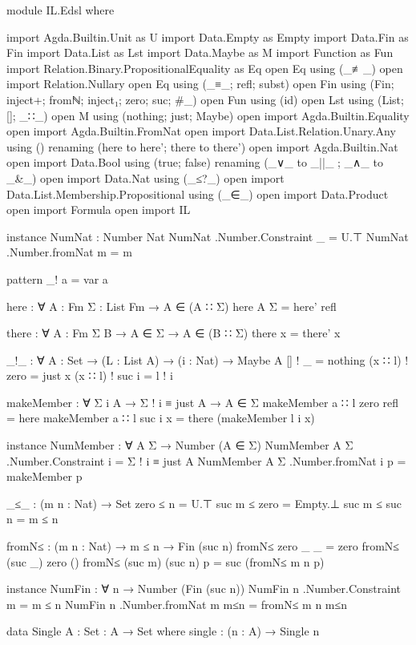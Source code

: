 \begin{spverbatim}
module IL.Edsl where

import Agda.Builtin.Unit as U
import Data.Empty as Empty
import Data.Fin as Fin
import Data.List as Lst
import Data.Maybe as M
import Function as Fun
import Relation.Binary.PropositionalEquality as Eq
open Eq using (_≢_)
open import Relation.Nullary
open Eq using (_≡_; refl; subst)
open Fin using (Fin; inject+; fromℕ; inject₁; zero; suc; #_)
open Fun using (id)
open Lst using (List; []; _∷_)
open M using (nothing; just; Maybe)
open import Agda.Builtin.Equality
open import Agda.Builtin.FromNat
open import Data.List.Relation.Unary.Any using () renaming (here to here'; there to there')
open import Agda.Builtin.Nat
open import Data.Bool using (true; false) renaming (_∨_ to _||_ ; _∧_ to _&_)
open import Data.Nat using (_≤?_)
open import Data.List.Membership.Propositional using (_∈_)
open import Data.Product
open import Formula
open import IL

instance
  NumNat : Number Nat
  NumNat .Number.Constraint _ = U.⊤
  NumNat .Number.fromNat    m = m

pattern _! a = var a

here : ∀ {A : Fm} {Σ : List Fm} → A ∈ (A ∷ Σ)
here {A} {Σ} = here' refl

there : ∀ {A : Fm} {Σ B} → A ∈ Σ → A ∈ (B ∷ Σ)
there x = there' x

_!_ : ∀ {A : Set} → (L : List A) → (i : Nat) → Maybe A
[] ! _ = nothing
(x ∷ l) ! zero = just x
(x ∷ l) ! suc i = l ! i

makeMember : ∀ {Σ i A} → Σ ! i ≡ just A → A ∈ Σ
makeMember {a ∷ l} {zero} refl = here
makeMember {a ∷ l} {suc i} x = there (makeMember {l} {i} x)

instance
  NumMember : ∀ {A Σ} → Number (A ∈ Σ)
  NumMember {A} {Σ} .Number.Constraint i = Σ ! i ≡ just A
  NumMember {A} {Σ} .Number.fromNat i {{p}} = makeMember p

_≤_ : (m n : Nat) → Set
zero  ≤ n     = U.⊤
suc m ≤ zero  = Empty.⊥
suc m ≤ suc n = m ≤ n

fromN≤ : (m n : Nat) → m ≤ n → Fin (suc n)
fromN≤ zero    _       _  = zero
fromN≤ (suc _) zero    ()
fromN≤ (suc m) (suc n) p  = suc (fromN≤ m n p)

instance
  NumFin : ∀ {n} → Number (Fin (suc n))
  NumFin {n} .Number.Constraint m         = m ≤ n
  NumFin {n} .Number.fromNat    m {{m≤n}} = fromN≤ m n m≤n

data Single {A : Set} : A → Set where
  single : (n : A) → Single n


\end{spverbatim}

